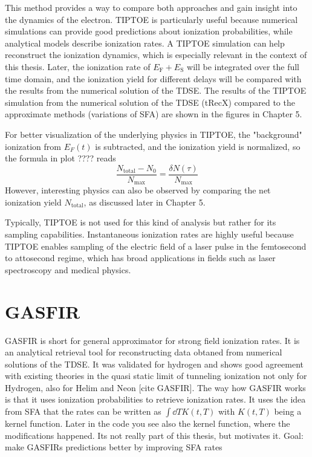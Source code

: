 This method provides a way to compare both approaches and gain insight into the dynamics of the electron.
TIPTOE is particularly useful because numerical simulations can provide good predictions about ionization probabilities, while analytical models describe ionization rates.
A TIPTOE simulation can help reconstruct the ionization dynamics, which is especially relevant in the context of this thesis.
Later, the ionization rate of $E_{\mathrm{F}}+E_{\mathrm{S}}$ will be integrated over the full time domain, and the ionization yield for different delays will be compared with the results from the numerical solution of the TDSE.
The results of the TIPTOE simulation from the numerical solution of the TDSE (tRecX) compared to the approximate methods (variations of SFA) are shown in the figures in Chapter 5.

For better visualization of the underlying physics in TIPTOE, the "background" ionization from $E_F(t)$ is subtracted, and the ionization yield is normalized, so the formula in plot ???? reads
\begin{equation*}
\frac{N_{\mathrm{total}}-N_0}{N_{\mathrm{max}}}=\frac{\delta N(\tau)}{N_{\mathrm{max}}}
\end{equation*}
However, interesting physics can also be observed by comparing the net ionization yield $N_{\mathrm{total}}$, as discussed later in Chapter 5.

Typically, TIPTOE is not used for this kind of analysis but rather for its sampling capabilities.
Instantaneous ionization rates are highly useful because TIPTOE enables sampling of the electric field of a laser pulse in the femtosecond to attosecond regime, which has broad applications in fields such as laser spectroscopy and medical physics.






\section{GASFIR}
GASFIR is short for general approximator for strong field ionization rates.
It is an analytical retrieval tool for reconstructing data obtaned from numerical solutions of the TDSE. 
It was validated for hydrogen and shows good agreement with existing theories in the quasi static limit of tunneling ionization not only for Hydrogen, also for Helim and Neon [cite GASFIR].
The way how GASFIR works is that it uses ionization probabilities to retrieve ionization rates. 
It uses the idea from SFA that the rates can be written as $\int \dd T K(t,T)$ with $K(t,T)$ being a kernel function.
Later in the code you see also the kernel function, where the modifications happened. 
Its not really part of this thesis, but motivates it.
Goal: make GASFIRs predictions better by improving SFA rates




